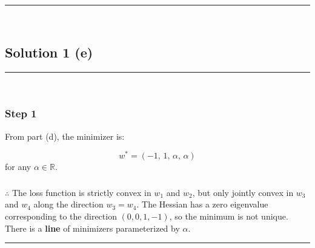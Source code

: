 \documentclass{article}
\begin{document}
\noindent\rule{\textwidth}{0.4pt}\\

\newpage

\subsection*{Solution 1 (e)}
\noindent\rule{\textwidth}{0.4pt}\\

\subsubsection*{Step 1}
\parbox{\textwidth}{
From part (d), the minimizer is:
}
$$
w^* = (-1,\, 1,\, \alpha,\, \alpha)
$$
for any $\alpha \in \mathbb{R}$.

\subsubsection*{\normalfont}{$\therefore$ The loss function is strictly convex in $w_1$ and $w_2$, but only jointly convex in $w_3$ and $w_4$ along the direction $w_3 = w_4$. The Hessian has a zero eigenvalue corresponding to the direction $(0,0,1,-1)$, so the minimum is not unique. There is a \textbf{line} of minimizers parameterized by $\alpha$.}

\noindent\rule{\textwidth}{0.4pt}\\
\end{document}
